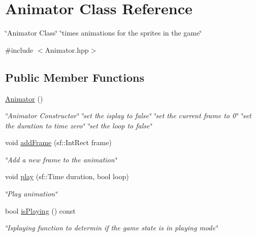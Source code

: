 \hypertarget{classAnimator}{}\section{Animator Class Reference}
\label{classAnimator}


\char`\"{}\+Animator Class\char`\"{}  \char`\"{}times animations for the sprites in the game\char`\"{}  




{\ttfamily \#include $<$Animator.\+hpp$>$}

\subsection*{Public Member Functions}
\begin{DoxyCompactItemize}
\item 
\mbox{\label{classAnimator_a701eeb9283612be2027425efb06bbff7}} 
\hyperlink{classAnimator_a701eeb9283612be2027425efb06bbff7}{Animator} ()
\begin{DoxyCompactList}\small\item\em \char`\"{}\+Animator Constructor\char`\"{}  \char`\"{}set the isplay to false\char`\"{}  \char`\"{}set the current frame to 0\char`\"{}  \char`\"{}set the duration to time zero\char`\"{}  \char`\"{}set the loop to false\char`\"{} \end{DoxyCompactList}\item 
void \hyperlink{classAnimator_a5acf71c2ee34281b7acd09af5d7a2b77}{add\+Frame} (sf\+::\+Int\+Rect frame)
\begin{DoxyCompactList}\small\item\em \char`\"{}\+Add a new frame to the animation\char`\"{} \end{DoxyCompactList}\item 
void \hyperlink{classAnimator_a36e5cb2d273648b60b32f9dfdec08b63}{play} (sf\+::\+Time duration, bool loop)
\begin{DoxyCompactList}\small\item\em \char`\"{}\+Play animation\char`\"{} \end{DoxyCompactList}\item 
bool \hyperlink{classAnimator_af652cfa1671a9a8155f85b2b33f65a17}{is\+Playing} () const
\begin{DoxyCompactList}\small\item\em \char`\"{}\+Isplaying function to determin if the game state is in playing mode\char`\"{} \end{DoxyCompactList}\item 

\end{DoxyCompactItemize}
